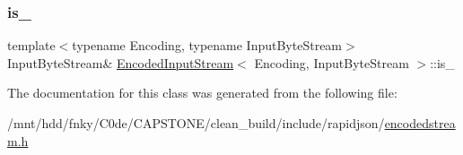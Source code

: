 \mbox{\label{classEncodedInputStream_ab07b45f34f288184313750af5f7077b6}} 
\subsubsection{\texorpdfstring{is\+\_\+}{is\_}}
{\footnotesize\ttfamily template$<$typename Encoding, typename Input\+Byte\+Stream$>$ \\
Input\+Byte\+Stream\& \hyperlink{classEncodedInputStream}{Encoded\+Input\+Stream}$<$ Encoding, Input\+Byte\+Stream $>$\+::is\+\_\+\hspace{0.3cm}{\ttfamily [private]}}



The documentation for this class was generated from the following file\+:\begin{DoxyCompactItemize}
\item 
/mnt/hdd/fnky/\+C0de/\+C\+A\+P\+S\+T\+O\+N\+E/clean\+\_\+build/include/rapidjson/\hyperlink{encodedstream_8h}{encodedstream.\+h}\end{DoxyCompactItemize}
